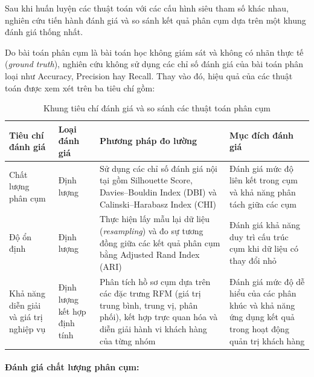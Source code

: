 \documentclass[12pt]{ai_conquer2026}
\begin{document}
Sau khi huấn luyện các thuật toán với các cấu hình siêu tham số khác nhau, nghiên cứu tiến hành đánh giá và so sánh kết quả phân cụm dựa trên một khung đánh giá thống nhất. 

Do bài toán phân cụm là bài toán học không giám sát và không có nhãn thực tế (\textit{ground truth}), nghiên cứu không sử dụng các chỉ số đánh giá của bài toán phân loại như Accuracy, Precision hay Recall. Thay vào đó, hiệu quả của các thuật toán được xem xét trên ba tiêu chí gồm: 

\begin{table}[H]
\centering
\caption{Khung tiêu chí đánh giá và so sánh các thuật toán phân cụm}
\label{tab:clustering_evaluation_framework}
\renewcommand{\arraystretch}{1.3}
\begin{tabular}{p{3.5cm}p{3cm}p{5cm}p{3cm}}
\toprule
\textbf{Tiêu chí đánh giá} & 
\textbf{Loại đánh giá} & 
\textbf{Phương pháp đo lường} &
\textbf{Mục đích đánh giá} \\
\midrule

Chất lượng phân cụm &
Định lượng &
Sử dụng các chỉ số đánh giá nội tại gồm Silhouette Score, Davies--Bouldin Index (DBI) và Calinski--Harabasz Index (CHI) &
Đánh giá mức độ liên kết trong cụm và khả năng phân tách giữa các cụm \\

\midrule

Độ ổn định &
Định lượng &
Thực hiện lấy mẫu lại dữ liệu (\textit{resampling}) và đo sự tương đồng giữa các kết quả phân cụm bằng Adjusted Rand Index (ARI) &
Đánh giá khả năng duy trì cấu trúc cụm khi dữ liệu có thay đổi nhỏ \\

\midrule

Khả năng diễn giải và giá trị nghiệp vụ &
Định lượng kết hợp định tính &
Phân tích hồ sơ cụm dựa trên các đặc trưng RFM (giá trị trung bình, trung vị, phân phối), kết hợp trực quan hóa và diễn giải hành vi khách hàng của từng nhóm &
Đánh giá mức độ dễ hiểu của các phân khúc và khả năng ứng dụng kết quả trong hoạt động quản trị khách hàng \\

\bottomrule
\end{tabular}
\end{table}

\paragraph{Đánh giá chất lượng phân cụm:}
\end{document}

